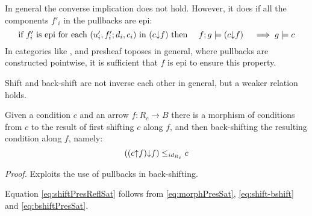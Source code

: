 In general the converse implication does not hold. However, it does if all the components $f'_i$ in the pullbacks are epi:
\begin{equation}
    \label{eq:bshiftPresSat}
    \mbox{if $f'_i$ is epi for each $(u'_i,f'_i;d_i,c_i)$ in $(c{\downarrow} f)$ then }
    \quad f;g \models (c{\downarrow} f)
     \quad \implies g \models c
\end{equation}
In categories like ,  and presheaf toposes in general, where pullbacks are constructed pointwise, it is sufficient that $f$ is epi to ensure this property.

Shift and back-shift are not inverse each other in general, but a weaker relation holds.

\begin{proposition}
    Given a condition $c$ and an arrow $f:R_c \to B$ there is a morphism of conditions from $c$ to the result of first shifting $c$ along $f$, and then back-shifting the resulting condition along $f$, namely:
\begin{equation}
    \label{eq:shift-bshift}
    ((c{\uparrow} f){\downarrow} f) \leq_{id_{R_c}} c
\end{equation}    
\end{proposition}
\emph{Proof.} Exploits the use of pullbacks in back-shifting.

\begin{proposition}
    Equation \eqref{eq:shiftPresReflSat} follows from \eqref{eq:morphPresSat}, \eqref{eq:shift-bshift} and \eqref{eq:bshiftPresSat}.
\end{proposition}
